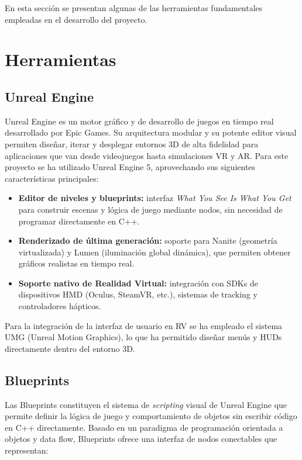 
En esta sección se presentan algunas de las herramientas fundamentales empleadas en el desarrollo del proyecto.
\section{Herramientas}
\subsection{Unreal Engine}

Unreal Engine es un motor gráfico y de desarrollo de juegos en tiempo real desarrollado por Epic Games. Su arquitectura modular y su potente editor visual permiten diseñar, iterar y desplegar entornos 3D de alta fidelidad para aplicaciones que van desde videojuegos hasta simulaciones VR y AR. Para este proyecto se ha utilizado Unreal Engine 5, aprovechando sus siguientes características principales:

\begin{itemize}
  \item \textbf{Editor de niveles y blueprints:} interfaz  \textit{What You See Is What You Get} para construir escenas y lógica de juego mediante nodos, sin necesidad de programar directamente en C++.
  \item \textbf{Renderizado de última generación:} soporte para Nanite (geometría virtualizada) y Lumen (iluminación global dinámica), que permiten obtener gráficos realistas en tiempo real.
  \item \textbf{Soporte nativo de Realidad Virtual:} integración con SDKs de dispositivos HMD (Oculus, SteamVR, etc.), sistemas de tracking y controladores hápticos.
\end{itemize}

Para la integración de la interfaz de usuario en RV se ha empleado el sistema UMG (Unreal Motion Graphics), lo que ha permitido diseñar menús y HUDs directamente dentro del entorno 3D.

\subsection{Blueprints} 
Las Blueprints constituyen el sistema de \textit{scripting} visual de Unreal Engine que permite definir la lógica de juego y comportamiento de objetos sin escribir código en C++ directamente. Basado en un paradigma de programación orientada a objetos y data flow, Blueprints ofrece una interfaz de nodos conectables que representan:

